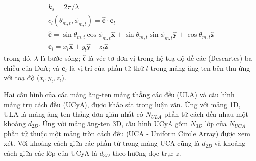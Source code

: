 \begin{equation}
    \begin{aligned}
        &k_s = 2\pi/\lambda \\
        &c_l(\theta_{m, t}, \phi_{m, t}) = \widehat{\boldsymbol{c}} \cdot \boldsymbol{c}_l \\
        &\widehat{\boldsymbol{c}}=\sin \theta_{m, t} \cos \phi_{m, t} \widehat{\boldsymbol{x}}+\sin \theta_{m, t} \sin \phi_{m, t} \widehat{\boldsymbol{y}}+\cos \theta_{m, t} \widehat{\boldsymbol{z}} \\
        &\boldsymbol{c}_l=x_{l} \widehat{\boldsymbol{x}}+y_{l} \widehat{\boldsymbol{y}}+z_{l} \hat{\boldsymbol{z}}
    \end{aligned}
\end{equation}
trong đó, $\lambda$ là bước sóng; $\widehat{\boldsymbol{c}}$ là véc-tơ đơn vị trong hệ toạ độ đề-các (Descartes) ba chiều của DoA; và $\boldsymbol{c}_l$ là vị trí của phần tử thứ $l$ trong mảng ăng-ten bên thu ứng với toạ độ ($x_l, y_l, z_l$).

Hai cấu hình của các mảng ăng-ten mảng thẳng các đều (ULA) và cấu hình mảng trụ cách đều (UCyA), được khảo sát trong luận văn. Ứng với mảng 1D, ULA là mảng ăng-ten thẳng đơn giản nhất có $N_{ULA}$ phần tử cách đều nhau một khoảng $d_{2D}$. Ứng với mảng ăng-ten 3D, cấu hình UCyA gồm $N_{3D}$ lớp của $N_{UCA}$ phần tử thuộc một mảng tròn cách đều (UCA - Uniform Circle Array) được xem xét. Với khoảng cách giữa các phần tử trong mảng UCA cũng là $d_{2D}$ và khoảng cách giữa các lớp của UCyA là $d_{3D}$ theo hướng dọc trục $z$. 



